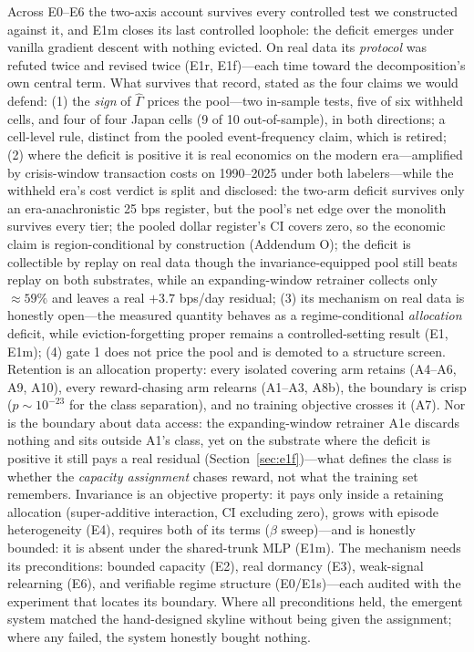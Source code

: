 \documentclass{article}
\begin{document}
Across E0--E6 the two-axis account survives every controlled test we
constructed against it, and E1m closes its last controlled loophole:
the deficit emerges under vanilla gradient descent with nothing
evicted. On real data its \emph{protocol} was refuted
twice and revised twice (E1r, E1f)---each time toward the
decomposition's own central term. What survives that record, stated
as the four claims we would defend: (1) the \emph{sign} of
$\hat\Gamma$ prices the pool---two in-sample tests, five of six
withheld cells, and four of four Japan cells (9 of 10 out-of-sample),
in both directions; a cell-level rule, distinct from the pooled
event-frequency claim, which is retired; (2) where the deficit is positive
it is real economics on the modern era---amplified by crisis-window
transaction costs on 1990--2025 under both labelers---while the
withheld era's cost verdict is split and disclosed: the two-arm
deficit survives only an era-anachronistic 25 bps register, but the
pool's net edge over the monolith survives every tier; the pooled
dollar register's CI covers zero, so the economic claim is
region-conditional by construction (Addendum O); the deficit is
collectible by replay on real data though the
invariance-equipped pool still beats replay on both substrates,
while an expanding-window retrainer collects only ${\approx}59\%$
and leaves a real $+3.7$ bps/day residual;
(3) its mechanism on real data is honestly open---the measured
quantity behaves as a regime-conditional \emph{allocation} deficit,
while eviction-forgetting proper remains a controlled-setting result
(E1, E1m); (4) gate 1 does not price the pool and is demoted to a
structure screen. Retention is
an allocation property: every isolated covering arm retains
(A4--A6, A9, A10), every reward-chasing arm relearns (A1--A3, A8b), the
boundary is crisp ($p \sim 10^{-23}$ for the class separation), and no
training objective crosses it (A7). Nor is the boundary about data
access: the expanding-window retrainer A1e discards nothing and sits
outside A1's class, yet on the substrate where the deficit is
positive it still pays a real residual
(Section~\ref{sec:e1f})---what defines the class is whether the
\emph{capacity assignment} chases reward, not what the training set
remembers. Invariance is an objective property:
it pays only inside a retaining allocation (super-additive interaction,
CI excluding zero), grows with episode heterogeneity (E4), requires
both of its terms ($\beta$ sweep)---and is honestly bounded: it is
absent under the shared-trunk MLP (E1m). The mechanism needs its preconditions:
bounded capacity (E2), real dormancy (E3), weak-signal relearning (E6),
and verifiable regime structure (E0/E1s)---each audited with the
experiment that locates its boundary. Where all preconditions held, the
emergent system matched the hand-designed skyline without being given the
assignment; where any failed, the system honestly bought nothing.
\end{document}
